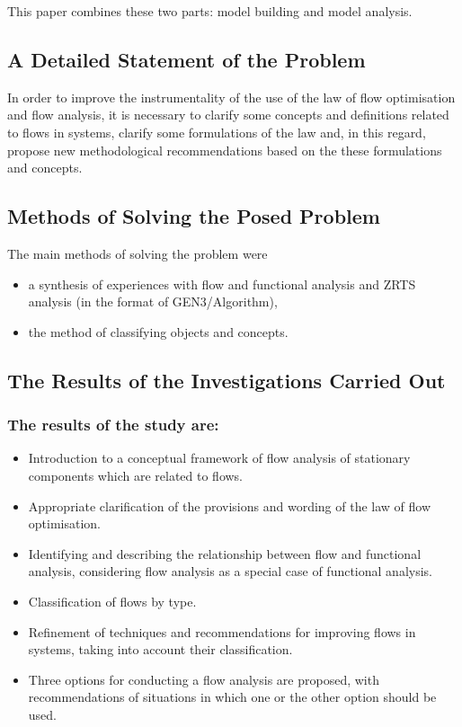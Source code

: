 \documentclass[a4paper,11pt]{article}
\begin{document}
This paper combines these two parts: model building and model analysis.

\subsection{A Detailed Statement of the Problem}

In order to improve the instrumentality of the use of the law of flow
optimisation and flow analysis, it is necessary to clarify some concepts and
definitions related to flows in systems, clarify some formulations of the law
and, in this regard, propose new methodological recommendations based on the
these formulations and concepts.

\subsection{Methods of Solving the Posed Problem}

The main methods of solving the problem were
\begin{itemize}
\item a synthesis of experiences with flow and functional analysis and ZRTS
  analysis (in the format of GEN3/Algorithm),
\item the method of classifying objects and concepts.
\end{itemize}

\subsection{The Results of the Investigations Carried Out}

\subsubsection{The results of the study are:}
\begin{itemize}
\item Introduction to a conceptual framework of flow analysis of stationary
  components which are related to flows.
\item Appropriate clarification of the provisions and wording of the law of
  flow optimisation.
\item Identifying and describing the relationship between flow and functional
  analysis, considering flow analysis as a special case of functional
  analysis.
\item Classification of flows by type.
\item Refinement of techniques and recommendations for improving flows in
  systems, taking into account their classification.
\item Three options for conducting a flow analysis are proposed, with
  recommendations of situations in which one or the other option should be
  used.
\end{itemize}
\end{document}
